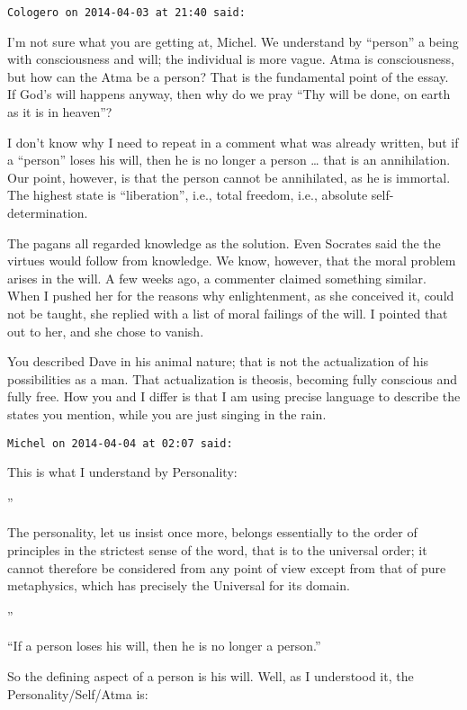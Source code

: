 \begin{footnotesize}
\begin{sffamily}
\hfill

\texttt{Cologero on 2014-04-03 at 21:40 said: }

I'm not sure what you are getting at, Michel. We understand by “person” a being with consciousness and will; the individual is more vague. Atma is consciousness, but how can the Atma be a person? That is the fundamental point of the essay. If God's will happens anyway, then why do we pray “Thy will be done, on earth as it is in heaven”?

I don't know why I need to repeat in a comment what was already written, but if a “person” loses his will, then he is no longer a person … that is an annihilation. Our point, however, is that the person cannot be annihilated, as he is immortal. The highest state is “liberation”, i.e., total freedom, i.e., absolute self-determination.

The pagans all regarded knowledge as the solution. Even Socrates said the the virtues would follow from knowledge. We know, however, that the moral problem arises in the will. A few weeks ago, a commenter claimed something similar. When I pushed her for the reasons why enlightenment, as she conceived it, could not be taught, she replied with a list of moral failings of the will. I pointed that out to her, and she chose to vanish.

You described Dave in his animal nature; that is not the actualization of his possibilities as a man. That actualization is theosis, becoming fully conscious and fully free. How you and I differ is that I am using precise language to describe the states you mention, while you are just singing in the rain.


\hfill

\texttt{Michel on 2014-04-04 at 02:07 said: }

This is what I understand by Personality:

”

The personality, let us insist once more, belongs essentially to the order of principles in the strictest sense of the word, that is to the universal order; it cannot therefore be considered from any point of view except from that of pure metaphysics, which has precisely the Universal for its domain.

”

“If a person loses his will, then he is no longer a person.”

So the defining aspect of a person is his will. Well, as I understood it, the Personality/Self/Atma is:


\end{sffamily}
\end{footnotesize}
